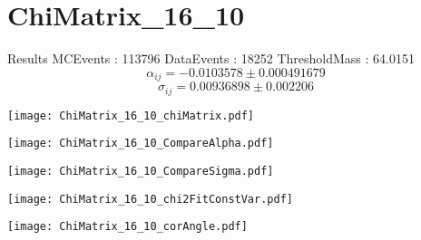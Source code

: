 \documentclass[a4paper,12pt]{article}
\begin{document}
\section{ChiMatrix\_16\_10}
\begin{minipage}{0.49\linewidth} Results \newline
MCEvents : 113796\newline
DataEvents : 18252 \newline
ThresholdMass : 64.0151\\
$$\alpha_{ij} = -0.0103578\pm 0.000491679$$
$$\sigma_{ij} = 0.00936898\pm 0.002206$$
\end{minipage}\hfill
\begin{minipage}{0.49\linewidth} 
\texttt{[image: ChiMatrix\_16\_10\_chiMatrix.pdf]}\\
\end{minipage}
\hfill
\begin{minipage}{0.49\linewidth} 
\texttt{[image: ChiMatrix\_16\_10\_CompareAlpha.pdf]}\\
\end{minipage}
\hfill
\begin{minipage}{0.49\linewidth} 
\texttt{[image: ChiMatrix\_16\_10\_CompareSigma.pdf]}\\
\end{minipage}
\begin{minipage}{0.49\linewidth} 
\texttt{[image: ChiMatrix\_16\_10\_chi2FitConstVar.pdf]}\\
\end{minipage}
\hfill
\begin{minipage}{0.49\linewidth} 
\texttt{[image: ChiMatrix\_16\_10\_corAngle.pdf]}\\
\end{minipage}
\end{document}
